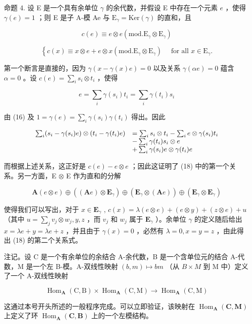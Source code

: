 命题 4. 设 E 是一个具有余单位 \(\gamma\) 的余代数，并假设 E 中存在一个元素 \(e\) ，使得 \(\gamma(e) = 1\) ；则 E 是子 A-模 Ae 与 \(\mathrm{E}_{\gamma} = \mathrm{Ker}(\gamma)\) 的直和，且

\[
c (e) \equiv e \otimes e (\mathrm{mod.} \mathrm{E} _ {\gamma} \otimes \mathrm{E} _ {\gamma})\tag{18}
\]

\[
\left\{c (x) \equiv x \otimes e + e \otimes x (\mathrm{mod.} \mathrm{E} _ {\gamma} \otimes \mathrm{E} _ {\gamma}) \quad \text { for all } x \in \mathrm{E} _ {\gamma}. \right.
\]

第一个断言是直接的，因为 \(\gamma(x - \gamma(x)e) = 0\) 以及关系 \(\gamma(\alpha e) = 0\) 蕴含 \(\alpha = 0\) 。设 \(c(e) = \sum_{i} s_i \otimes t_i\) ，使得

\[
e = \sum_ {i} \gamma (s _ {i}) t _ {i} = \sum_ {i} \gamma (t _ {i}) s _ {i}
\]

由 (16) 及 \(1 = \gamma(e) = \sum_{i} \gamma(s_i) \gamma(t_i)\) 得出。因此

\[
\begin{array}{r l} \sum_ {i} (s _ {i} - \gamma (s _ {i}) e) \otimes (t _ {i} - \gamma (t _ {i}) e) & = \sum_ {i} s _ {i} \otimes t _ {i} - \sum_ {i} e \otimes \gamma (s _ {i}) t _ {i} \\ & - \sum_ {i} \gamma (t _ {i}) s _ {i} \otimes e \\ & + \sum_ {i} \gamma (s _ {i}) e \otimes \gamma (t _ {i}) e \end{array}
\]

而根据上述关系，这正好是 \(c(e) - e \otimes e\) ；因此这证明了 (18) 中的第一个关系。另一方面，E \(\otimes\) E 作为直和的分解

\[
\mathbf {A} (e \otimes e) \oplus ((\mathbf {A} e) \otimes \mathbf {E} _ {\gamma}) \oplus (\mathbf {E} _ {\gamma} \otimes (\mathbf {A} e)) \oplus (\mathbf {E} _ {\gamma} \otimes \mathbf {E} _ {\gamma})
\]

使得我们可以写出，对于 \(x \in \mathbf{E}_{\gamma}\) , \(c(x) = \lambda(e \otimes e) + (e \otimes y) + (z \otimes e) + u\) （其中 \(u = \sum_{j} v_{j} \otimes w_{j}, y, z\) ，而 \(v_{j}\) 和 \(w_{j}\) 属于 \(\mathbf{E}_{\gamma}\) ）。余单位 \(\gamma\) 的定义随后给出 \(x = \lambda e + y = \lambda e + z\) ，并且由于 \(\gamma(x) = 0\) ，必然有 \(\lambda = 0, x = y = z\) ，由此得出 (18) 的第二个关系式。

注记。设 C 是一个有余单位的余结合 A-余代数，B 是一个含单位元的结合 A-代数，M 是一个左 B-模。A-双线性映射 \((b, m) \mapsto bm\) （从 \(B \times M\) 到 M 中）定义了一个 A-双线性映射

\[
\operatorname{Hom} _ {\mathbf {A}} (\mathrm{C}, \mathrm{B}) \times \operatorname{Hom} _ {\mathbf {A}} (\mathrm{C}, \mathrm{M}) \rightarrow \operatorname{Hom} _ {\mathbf {A}} (\mathrm{C}, \mathrm{M})
\]

这通过本号开头所述的一般程序完成。可以立即验证，该映射在 \(\operatorname{Hom}_{\mathbf{A}}(\mathbf{C}, \mathbf{M})\) 上定义了环 \(\operatorname{Hom}_{\mathbf{A}}(\mathbf{C}, \mathbf{B})\) 上的一个左模结构。

